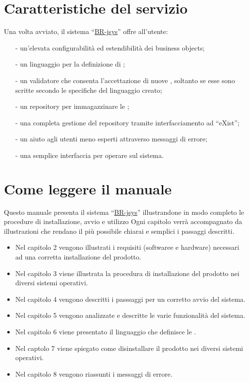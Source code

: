 \section{Caratteristiche del servizio}
Una volta avviato, il sistema ``\underline{BR-jsys}'' offre all'utente:
\begin{itemize}
\item[-] un'elevata configurabilit\`a ed estendibilit\`a dei business objects;
\item[-] un linguaggio per la definizione di \br;
\item[-] un validatore che consenta l'accettazione di nuove \br, soltanto se esse sono scritte secondo le specifiche del linguaggio creato;
\item[-] un repository per immagazzinare le \br;
\item[-] una completa gestione del repository tramite interfacciamento ad ``eXist'';
\item[-] un aiuto agli utenti meno esperti attraverso  messaggi di errore;
\item[-] una semplice interfaccia per operare sul sistema.
\end{itemize}

\section{Come leggere il manuale}
 Questo manuale presenta il sistema ``\underline{BR-jsys}'' illustrandone in modo completo le procedure di installazione, avvio e utilizzo 
Ogni capitolo verr\`a accompagnato da illustrazioni che rendano il pi\`u possibile chiarai e semplici i passaggi descritti.
 \begin{itemize}
 \item Nel capitolo 2 vengono illustrati i requisiti (softwaree e hardware) necessari ad una corretta installazione del prodotto.
\item Nel capitolo 3 viene illustrata la procedura di installazione del prodotto nei diversi sistemi operativi.
\item Nel capitolo 4 vengono descritti i passsaggi per un corretto avvio del sistema.
\item Nel capitolo 5 vengono analizzate e descritte le varie funzionalit\`a del sistema.
\item Nel capitolo 6 viene presentato il linguaggio che definisce le \br.
\item Nel captolo 7 viene spiegato come disinstallare il prodotto nei diversi sistemi operativi.
\item Nel capitolo 8 vengono riassunti i messaggi di errore.
 \end{itemize}


